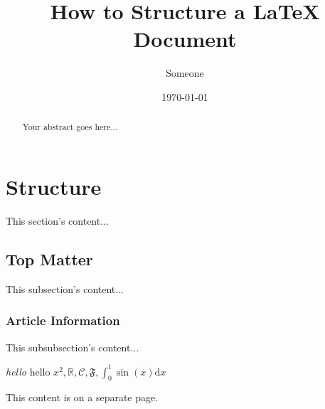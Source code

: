 \documentclass{article}
\begin{document}
\title{How to Structure a LaTeX Document}
\author{Someone}
\date{\today}
\maketitle

\begin{abstract}
Your abstract goes here...
\end{abstract}

\section{Structure}
This section's content...

\subsection{Top Matter}
This subsection's content...

\subsubsection{Article Information}
This subsubsection's content...

\emph{hello} hello $x^2, \mathbb R, \mathcal C, \mathfrak F, \int_0^1 \sin(x) \mathrm d x$

\pagebreak

This content is on a separate page.
\end{document}
